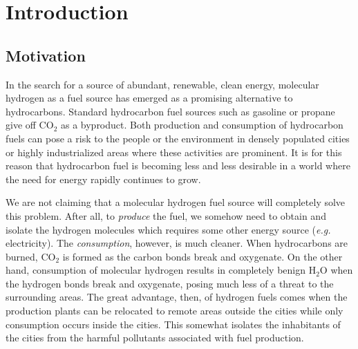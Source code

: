 \documentclass[oneside, noacknowlegments]{BYUPhys}
\begin{document}
 \frontmatter

\makepreliminarypages

\tableofcontents
 
\listoffigures

\mainmatter


\chapter{Introduction}

\section{Motivation}
\label{sec:motivation}

In the search for a source of abundant, renewable, 
clean energy, molecular hydrogen as a fuel source has emerged as 
a promising alternative to hydrocarbons. Standard hydrocarbon fuel 
sources such as gasoline or propane give off $\mathrm{CO_2}$ as a 
byproduct. Both production and consumption of hydrocarbon fuels can 
pose a risk to the people or the environment in densely populated 
cities or highly industrialized areas where these activities are 
prominent. It is for this reason that hydrocarbon fuel is 
becoming less and less desirable in a world where the need for 
energy rapidly continues to grow.

We are not claiming that a molecular hydrogen fuel source will
completely solve this problem. After all, to \textit{produce} the
fuel, we somehow need to obtain and isolate the hydrogen molecules 
which requires some other energy source (\textit{e.g.} 
electricity). The \textit{consumption}, however, is much cleaner. 
When hydrocarbons are burned, $\mathrm{CO_{2}}$ is formed as the 
carbon bonds break and oxygenate. On the other hand, consumption of 
molecular hydrogen results in completely benign $\mathrm{H_{2}O}$ 
when the hydrogen bonds break and oxygenate, posing much less of a 
threat to the surrounding areas. The great advantage, then, of
hydrogen fuels comes when the production plants can be relocated
to remote areas outside the cities while only consumption occurs 
inside the cities. This somewhat isolates the inhabitants of the
cities from the harmful pollutants associated with fuel production.
\end{document}
